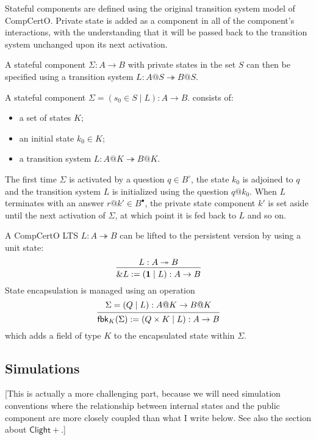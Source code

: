 \documentclass[acmsmall,screen,review,anonymous]{acmart}
\newcommand{\que}{\circ}
\newcommand{\ans}{\bullet}
\newcommand{\ClightP}{\ensuremath{\mathsf{Clight+}}}
\begin{document}
Stateful components are defined using
the original transition system model of CompCertO.
Private state is added as a component
in all of the component's interactions,
with the understanding that
it will be passed back to the transition system
unchanged upon its next activation.

A stateful component $\Sigma : A \rightarrow B$
with private states in the set $S$
can then be specified using a transition system
$L : A@S \twoheadrightarrow B@S$.

\begin{definition}
A stateful component
$\Sigma = (s_0 \in S \mid L) : A \rightarrow B$.
consists of:
\begin{itemize}
  \item a set of states $K$;
  \item an initial state $k_0 \in K$;
  \item a transition system $L : A@K \twoheadrightarrow B@K$.
\end{itemize}
\end{definition}

The first time $\Sigma$ is activated by a question $q \in B^\que$,
the state $k_0$ is adjoined to $q$
and the transition system $L$ is initialized using the question $q@k_0$.
When $L$ terminates with an answer $r@k' \in B^\ans$,
the private state component $k'$
is set aside until
the next activation of $\Sigma$,
at which point it is fed back to $L$ and so on.

A CompCertO LTS $L : A \twoheadrightarrow B$
can be lifted to the persistent version
by using a unit state:
\[
  \begin{prooftree}
    \hypo{L : A \twoheadrightarrow B}
    \infer1{\&L := (\mathbf{1} \mid L) : A \rightarrow B}
  \end{prooftree}
\]
State encapsulation is managed using an operation
\[
  \begin{prooftree}
    \hypo{\Sigma = (Q \mid L) : A@K \rightarrow B@K}
    \infer1{\mathsf{fbk}_K(\Sigma) := (Q \times K \mid L) : A \rightarrow B}
  \end{prooftree}
\]
which adds a field of type $K$ to the encapsulated state within $\Sigma$.

\subsection{Simulations}

[This is actually a more challenging part,
because we will need simulation conventions
where the relationship between internal states
and the public component are more closely coupled
than what I write below.
See also the section about \ClightP{}.]
\end{document}
